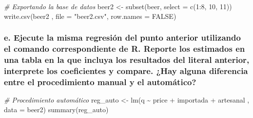 \documentclass[
]{article}
\newenvironment{Shaded}{\begin{snugshade}}{\end{snugshade}}
\newcommand{\AttributeTok}[1]{\textcolor[rgb]{0.77,0.63,0.00}{#1}}
\newcommand{\CommentTok}[1]{\textcolor[rgb]{0.56,0.35,0.01}{\textit{#1}}}
\newcommand{\ConstantTok}[1]{\textcolor[rgb]{0.00,0.00,0.00}{#1}}
\newcommand{\DecValTok}[1]{\textcolor[rgb]{0.00,0.00,0.81}{#1}}
\newcommand{\FunctionTok}[1]{\textcolor[rgb]{0.00,0.00,0.00}{#1}}
\newcommand{\NormalTok}[1]{#1}
\newcommand{\OtherTok}[1]{\textcolor[rgb]{0.56,0.35,0.01}{#1}}
\newcommand{\SpecialCharTok}[1]{\textcolor[rgb]{0.00,0.00,0.00}{#1}}
\newcommand{\StringTok}[1]{\textcolor[rgb]{0.31,0.60,0.02}{#1}}
\begin{document}
\begin{Shaded}
\begin{Highlighting}[]
\CommentTok{\# Exportando la base de datos}
\NormalTok{beer2 }\OtherTok{\textless{}{-}} \FunctionTok{subset}\NormalTok{(beer, }\AttributeTok{select =} \FunctionTok{c}\NormalTok{(}\DecValTok{1}\SpecialCharTok{:}\DecValTok{8}\NormalTok{, }\DecValTok{10}\NormalTok{, }\DecValTok{11}\NormalTok{))}
\FunctionTok{write.csv}\NormalTok{(beer2 , }\AttributeTok{file =} \StringTok{"beer2.csv"}\NormalTok{, }\AttributeTok{row.names =} \ConstantTok{FALSE}\NormalTok{)}
\end{Highlighting}
\end{Shaded}

\hypertarget{e.-ejecute-la-misma-regresiuxf3n-del-punto-anterior-utilizando-el-comando-correspondiente-de-r.-reporte-los-estimados-en-una-tabla-en-la-que-incluya-los-resultados-del-literal-anterior-interprete-los-coeficientes-y-compare.-hay-alguna-diferencia-entre-el-procedimiento-manual-y-el-automuxe1tico}{%
\subsubsection{e. Ejecute la misma regresión del punto anterior
utilizando el comando correspondiente de R. Reporte los estimados en una
tabla en la que incluya los resultados del literal anterior, interprete
los coeficientes y compare. ¿Hay alguna diferencia entre el
procedimiento manual y el
automático?}\label{e.-ejecute-la-misma-regresiuxf3n-del-punto-anterior-utilizando-el-comando-correspondiente-de-r.-reporte-los-estimados-en-una-tabla-en-la-que-incluya-los-resultados-del-literal-anterior-interprete-los-coeficientes-y-compare.-hay-alguna-diferencia-entre-el-procedimiento-manual-y-el-automuxe1tico}}

\begin{Shaded}
\begin{Highlighting}[]
\CommentTok{\# Procedimiento automático}
\NormalTok{reg\_auto }\OtherTok{\textless{}{-}} \FunctionTok{lm}\NormalTok{(q }\SpecialCharTok{\textasciitilde{}}\NormalTok{ price }\SpecialCharTok{+}\NormalTok{ importada }\SpecialCharTok{+}\NormalTok{ artesanal , }\AttributeTok{data =}\NormalTok{ beer2)}
\FunctionTok{summary}\NormalTok{(reg\_auto)}
\end{Highlighting}
\end{Shaded}
\end{document}
